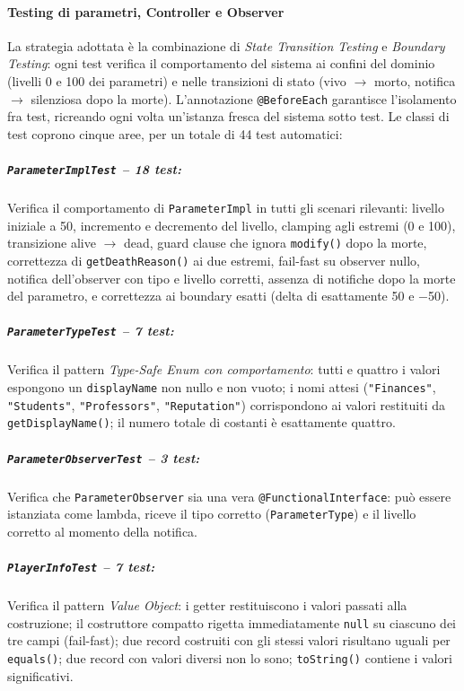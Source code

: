 \documentclass[11pt, a4paper, oneside]{report}
\begin{document}
\paragraph{Testing di parametri, Controller e Observer}

La strategia adottata è la combinazione di \emph{State Transition Testing}
e \emph{Boundary Testing}: ogni test verifica il comportamento del sistema
ai confini del dominio (livelli 0 e 100 dei parametri) e nelle transizioni
di stato (vivo $\to$ morto, notifica $\to$ silenziosa dopo la morte).
L'annotazione \texttt{@BeforeEach} garantisce l'isolamento fra test,
ricreando ogni volta un'istanza fresca del sistema sotto test.
Le classi di test coprono cinque aree, per un totale di 44 test automatici:

\subparagraph{\texttt{ParameterImplTest} -- 18 test:}
Verifica il comportamento di \texttt{ParameterImpl} in tutti gli scenari
rilevanti: livello iniziale a 50, incremento e decremento del livello,
clamping agli estremi (0 e 100), transizione alive $\to$ dead, guard
clause che ignora \texttt{modify()} dopo la morte, correttezza di
\texttt{getDeathReason()} ai due estremi, fail-fast su observer nullo,
notifica dell'observer con tipo e livello corretti, assenza di
notifiche dopo la morte del parametro, e correttezza ai boundary esatti
(delta di esattamente 50 e $-$50).

\subparagraph{\texttt{ParameterTypeTest} -- 7 test:}
Verifica il pattern \emph{Type-Safe Enum con comportamento}:
tutti e quattro i valori espongono un \texttt{displayName} non nullo
e non vuoto; i nomi attesi (\texttt{"Finances"}, \texttt{"Students"},
\texttt{"Professors"}, \texttt{"Reputation"}) corrispondono ai valori
restituiti da \texttt{getDisplayName()}; il numero totale di costanti
è esattamente quattro.

\subparagraph{\texttt{ParameterObserverTest} -- 3 test:}
Verifica che \texttt{ParameterObserver} sia una vera
\texttt{@FunctionalInterface}: può essere istanziata come lambda,
riceve il tipo corretto (\texttt{ParameterType}) e il livello corretto
al momento della notifica.

\subparagraph{\texttt{PlayerInfoTest} -- 7 test:}
Verifica il pattern \emph{Value Object}: i getter restituiscono i valori
passati alla costruzione; il costruttore compatto rigetta immediatamente
\texttt{null} su ciascuno dei tre campi (fail-fast); due record costruiti
con gli stessi valori risultano uguali per \texttt{equals()}; due record
con valori diversi non lo sono; \texttt{toString()} contiene i valori
significativi.
\end{document}
